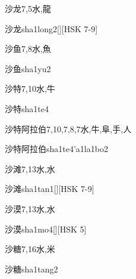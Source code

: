 \begin{Entry}{沙龙}{7,5}{⽔,⿓}
  \begin{Phonetics}{沙龙}{sha1long2}[][HSK 7-9]
  \end{Phonetics}
\end{Entry}

\begin{Entry}{沙鱼}{7,8}{⽔,⿂}
  \begin{Phonetics}{沙鱼}{sha1yu2}
  \end{Phonetics}
\end{Entry}

\begin{Entry}{沙特}{7,10}{⽔,⽜}
  \begin{Phonetics}{沙特}{sha1te4}
  \end{Phonetics}
\end{Entry}

\begin{Entry}{沙特阿拉伯}{7,10,7,8,7}{⽔,⽜,⾩,⼿,⼈}
  \begin{Phonetics}{沙特阿拉伯}{sha1te4'a1la1bo2}
  \end{Phonetics}
\end{Entry}

\begin{Entry}{沙滩}{7,13}{⽔,⽔}
  \begin{Phonetics}{沙滩}{sha1tan1}[][HSK 7-9]
  \end{Phonetics}
\end{Entry}

\begin{Entry}{沙漠}{7,13}{⽔,⽔}
  \begin{Phonetics}{沙漠}{sha1mo4}[][HSK 5]
  \end{Phonetics}
\end{Entry}

\begin{Entry}{沙糖}{7,16}{⽔,⽶}
  \begin{Phonetics}{沙糖}{sha1tang2}
  \end{Phonetics}
\end{Entry}

